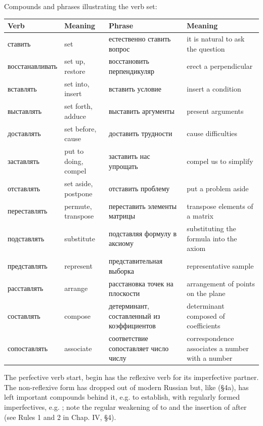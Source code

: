 Compounds and phrases illustrating the verb  set:

\begingroup
\small
\setlength{\tabcolsep}{3pt}
\renewcommand{\arraystretch}{1.05}
\begin{longtable}{@{}>{\cyrillicfont}p{34mm}p{28mm}>{\cyrillicfont}p{48mm}p{35mm}@{}}
\toprule
\normalfont Verb & Meaning & \normalfont Phrase & Meaning\\
\midrule
\endhead
ставить & set & естественно ставить вопрос & it is natural to ask the question\\
восстанавливать & set up, restore & восстановить перпендикуляр & erect a perpendicular\\
вставлять & set into, insert & вставить условие & insert a condition\\
выставлять & set forth, adduce & выставить аргументы & present arguments\\
доставлять & set before, cause & доставить трудности & cause difficulties\\
заставлять & put to doing, compel & заставить нас упрощать & compel us to simplify\\
отставлять & set aside, postpone & отставить проблему & put a problem aside\\
переставлять & permute, transpose & переставить элементы матрицы & transpose elements of a matrix\\
подставлять & substitute & подставляя формулу в аксиому & substituting the formula into the axiom\\
представлять & represent & представительная выборка & representative sample\\
расставлять & arrange & расстановка точек на плоскости & arrangement of points on the plane\\
составлять & compose & детерминант, составленный из коэффициентов & determinant composed of coefficients\\
сопоставлять & associate & соответствие сопоставляет число числу & correspondence associates a number with a number\\
\bottomrule
\end{longtable}
\endgroup

The perfective verb  start, begin has the reflexive verb  for its imperfective partner. The non-reflexive form  has dropped out of modern Russian but, like  (§4a), has left important compounds behind it, e.g.  to establish, with regularly formed imperfectives, e.g. ; note the regular weakening of  to  and the insertion of  after  (see Rules 1 and 2 in Chap. IV, §4).

